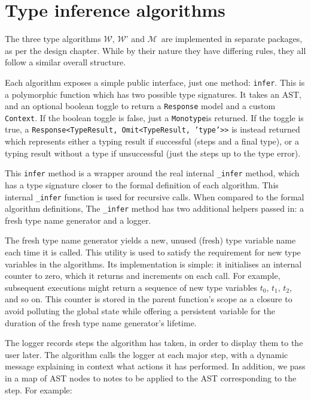 \documentclass[a4paper,fleqn,oneside,12pt]{report}
\newcommand{\W}{$\mathcal{W}$}
\newcommand{\M}{$\mathcal{M}$}
\begin{document}
\section{Type inference algorithms}\label{id:h.flyu66glh76t}

The three type algorithms \W, \W’ and \M\ are implemented in separate packages, as per the design chapter. While by their nature they have differing rules, they all follow a similar overall structure.

Each algorithm exposes a simple public interface, just one method: \texttt{infer}. This is a polymorphic function which has two possible type signatures. It takes an AST, and an optional boolean toggle to return a \texttt{Response} model and a custom \texttt{Context}. If the boolean toggle is false, just a \texttt{Monotype}is returned. If the toggle is true, a \texttt{Response<TypeResult, Omit<TypeResult, 'type'>>} is instead returned which represents either a typing result if successful (steps and a final type), or a typing result without a type if unsuccessful (just the steps up to the type error).

This \texttt{infer} method is a wrapper around the real internal \texttt{_infer} method, which has a type signature closer to the formal definition of each algorithm. This internal \texttt{_infer} function is used for recursive calls. When compared to the formal algorithm definitions, The \texttt{_infer} method has two additional helpers passed in: a fresh type name generator and a logger.

The fresh type name generator yields a new, unused (fresh) type variable name each time it is called. This utility is used to satisfy the requirement for new type variables in the algorithms. Its implementation is simple: it initialises an internal counter to zero, which it returns and increments on each call. For example, subsequent executions might return a sequence of new type variables $t_0$, $t_1$, $t_2$, and so on. This counter is stored in the parent function's scope as a closure to avoid polluting the global state while offering a persistent variable for the duration of the fresh type name generator's lifetime.

The logger records steps the algorithm has taken, in order to display them to the user later. The algorithm calls the logger at each major step, with a dynamic message explaining in context what actions it has performed. In addition, we pass in a map of AST nodes to notes to be applied to the AST corresponding to the step. For example:
\end{document}
